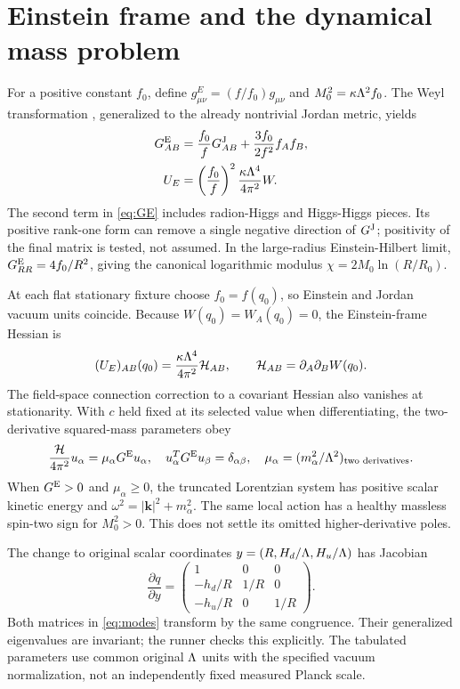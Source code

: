 \section{Einstein frame and the dynamical mass problem}

For a positive constant $f_0$, define $g^E_{\mu\nu}=(f/f_0)g_{\mu\nu}$ and $M_0^2=\kappa\Lambda^2 f_0$. The Weyl transformation \cite{kaiser}, generalized to the already nontrivial Jordan metric, yields
\begin{align}
 G^{\mathrm E}_{AB}&=\frac{f_0}{f}G^{\mathrm J}_{AB}
             +\frac{3f_0}{2f^2}f_Af_B,\label{eq:GE}\\
 U_E&=\left(\frac{f_0}{f}\right)^2\frac{\kappa\Lambda^4}{4\pi^2}W.
\end{align}
The second term in \eqref{eq:GE} includes radion-Higgs and Higgs-Higgs pieces. Its positive rank-one form can remove a single negative direction of $G^{\mathrm J}$; positivity of the final matrix is tested, not assumed. In the large-radius Einstein-Hilbert limit, $G^{\mathrm E}_{RR}=4f_0/R^2$, giving the canonical logarithmic modulus $\chi=2M_0\ln(R/R_0)$.

At each flat stationary fixture choose $f_0=f(q_0)$, so Einstein and Jordan vacuum units coincide. Because $W(q_0)=W_A(q_0)=0$, the Einstein-frame Hessian is
\begin{equation}
 (U_E)_{AB}(q_0)=\frac{\kappa\Lambda^4}{4\pi^2}\mathcal H_{AB},
 \qquad\mathcal H_{AB}=\partial_A\partial_B W(q_0).
\end{equation}
The field-space connection correction to a covariant Hessian also vanishes at stationarity. With $c$ held fixed at its selected value when differentiating, the two-derivative squared-mass parameters obey
\begin{equation}
 \frac{\mathcal H}{4\pi^2}u_\alpha=\mu_\alpha G^{\mathrm E} u_\alpha,
 \quad u_\alpha^TG^{\mathrm E} u_\beta=\delta_{\alpha\beta},
 \quad\mu_\alpha=(m_\alpha^2/\Lambda^2)_{\text{two derivatives}}.
 \label{eq:modes}
\end{equation}
When $G^{\mathrm E}>0$ and $\mu_\alpha\ge0$, the truncated Lorentzian system has positive scalar kinetic energy and $\omega^2=|\mathbf k|^2+m_\alpha^2$. The same local action has a healthy massless spin-two sign for $M_0^2>0$. This does not settle its omitted higher-derivative poles.

The change to original scalar coordinates $y=(R,H_d/\Lambda,H_u/\Lambda)$ has Jacobian
\begin{equation}
 \frac{\partial q}{\partial y}=
 \begin{pmatrix}1&0&0\\-h_d/R&1/R&0\\-h_u/R&0&1/R\end{pmatrix}.
\end{equation}
Both matrices in \eqref{eq:modes} transform by the same congruence. Their generalized eigenvalues are invariant; the runner checks this explicitly. The tabulated parameters use common original $\Lambda$ units with the specified vacuum normalization, not an independently fixed measured Planck scale.
